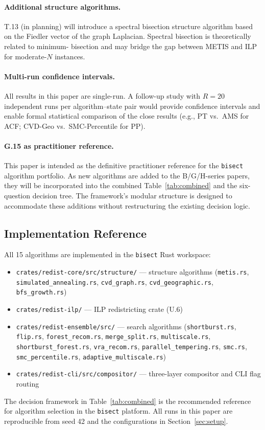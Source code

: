 \paragraph{Additional structure algorithms.}
T.13 (in planning) will introduce a spectral bisection structure algorithm
based on the Fiedler vector of the graph Laplacian.
Spectral bisection is theoretically related to minimum-\ec{} bisection and
may bridge the gap between METIS and ILP for moderate-$N$ instances.

\paragraph{Multi-run confidence intervals.}
All results in this paper are single-run.
A follow-up study with $R = 20$ independent runs per algorithm--state pair
would provide confidence intervals and enable formal statistical comparison
of the close results (e.g., PT vs.\ AMS for ACF; CVD-Geo vs.\ SMC-Percentile
for PP).

\paragraph{G.15 as practitioner reference.}
This paper is intended as the definitive practitioner reference for the
\texttt{bisect} algorithm portfolio.
As new algorithms are added to the B/G/H-series papers, they will be
incorporated into the combined Table~\ref{tab:combined} and the six-question
decision tree.
The framework's modular structure is designed to accommodate these additions
without restructuring the existing decision logic.

\subsection{Implementation Reference}

All 15 algorithms are implemented in the \texttt{bisect} Rust workspace:

\begin{itemize}
  \item \texttt{crates/redist-core/src/structure/} --- structure algorithms
        (\texttt{metis.rs}, \texttt{simulated\_annealing.rs},
        \texttt{cvd\_graph.rs}, \texttt{cvd\_geographic.rs},
        \texttt{bfs\_growth.rs})
  \item \texttt{crates/redist-ilp/} --- ILP redistricting crate (U.6)
  \item \texttt{crates/redist-ensemble/src/} --- search algorithms
        (\texttt{shortburst.rs}, \texttt{flip.rs},
        \texttt{forest\_recom.rs}, \texttt{merge\_split.rs},
        \texttt{multiscale.rs}, \texttt{shortburst\_forest.rs},
        \texttt{vra\_recom.rs}, \texttt{parallel\_tempering.rs},
        \texttt{smc.rs}, \texttt{smc\_percentile.rs},
        \texttt{adaptive\_multiscale.rs})
  \item \texttt{crates/redist-cli/src/compositor/} --- three-layer compositor
        and CLI flag routing
\end{itemize}

The decision framework in Table~\ref{tab:combined} is the recommended
reference for algorithm selection in the \texttt{bisect} platform.
All runs in this paper are reproducible from seed 42 and the configurations
in Section~\ref{sec:setup}.
